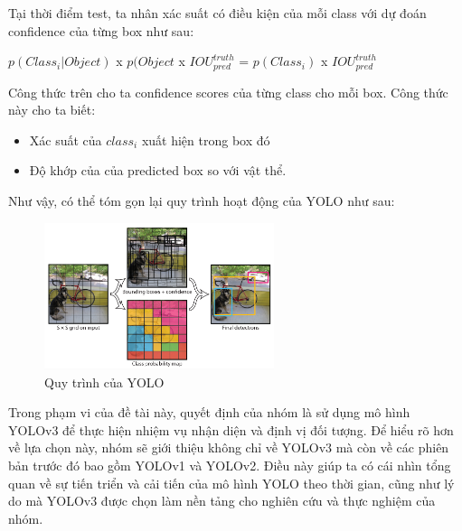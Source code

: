 \noindent Tại thời điểm test, ta nhân xác suất có điều kiện của mỗi class với dự đoán confidence của từng box như sau: 
\begin{center}
    $p(Class_{i}|Object)$ x $p(Object$ x $IOU^{truth}_{pred}$ = $p(Class_{i})$ x $IOU^{truth}_{pred}$
\end{center}
Công thức trên cho ta confidence scores của từng class cho mỗi box. Công thức này cho ta biết:
\begin{itemize}
    \item Xác suất của $class_i$ xuất hiện trong box đó
    \item Độ khớp của của predicted box so với vật thể.
\end{itemize}
Như vậy, có thể tóm gọn lại quy trình hoạt động của YOLO như sau:
\begin{figure}[htbp]
        \centering
        \includegraphics[width=0.6\textwidth]{images/2a-sign/grid2.png}
        \caption{Quy trình của YOLO}
\end{figure}
Trong phạm vi của đề tài này, quyết định của nhóm là sử dụng mô hình YOLOv3 để thực hiện nhiệm vụ nhận diện và định vị đối tượng. Để hiểu rõ hơn về lựa chọn này, nhóm sẽ giới thiệu không chỉ về YOLOv3 mà còn về các phiên bản trước đó bao gồm YOLOv1 và YOLOv2. Điều này giúp ta có cái nhìn tổng quan về sự tiến triển và cải tiến của mô hình YOLO theo thời gian, cũng như lý do mà YOLOv3 được chọn làm nền tảng cho nghiên cứu và thực nghiệm của nhóm.

